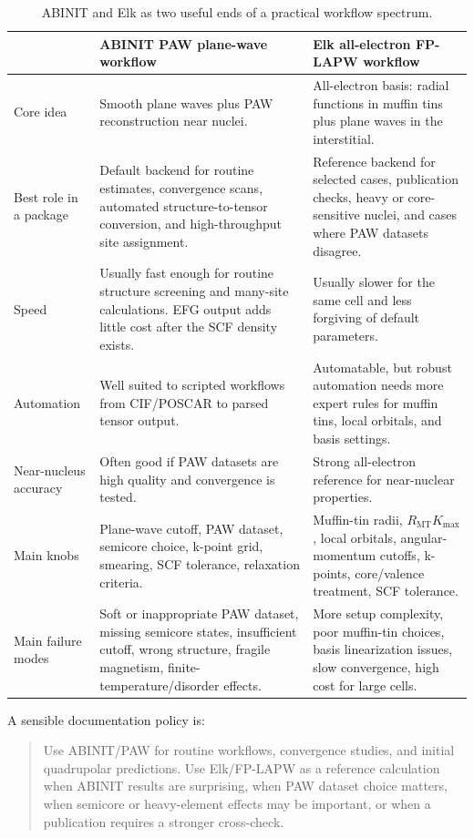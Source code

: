 \documentclass[11pt]{article}
\newcommand{\RMT}{R_{\mathrm{MT}}}
\begin{document}
\begin{table}[H]
\centering
\small
\begin{tabularx}{\textwidth}{L{0.18\textwidth}Y Y}
\toprule
 & \textbf{ABINIT PAW plane-wave workflow} & \textbf{Elk all-electron FP-LAPW workflow} \\
\midrule
Core idea & Smooth plane waves plus PAW reconstruction near nuclei. & All-electron basis: radial functions in muffin tins plus plane waves in the interstitial. \\
Best role in a package & Default backend for routine estimates, convergence scans, automated structure-to-tensor conversion, and high-throughput site assignment. & Reference backend for selected cases, publication checks, heavy or core-sensitive nuclei, and cases where PAW datasets disagree. \\
Speed & Usually fast enough for routine structure screening and many-site calculations.  EFG output adds little cost after the SCF density exists. & Usually slower for the same cell and less forgiving of default parameters. \\
Automation & Well suited to scripted workflows from CIF/POSCAR to parsed tensor output. & Automatable, but robust automation needs more expert rules for muffin tins, local orbitals, and basis settings. \\
Near-nucleus accuracy & Often good if PAW datasets are high quality and convergence is tested. & Strong all-electron reference for near-nuclear properties. \\
Main knobs & Plane-wave cutoff, PAW dataset, semicore choice, k-point grid, smearing, SCF tolerance, relaxation criteria. & Muffin-tin radii, $\RMT K_{\max}$, local orbitals, angular-momentum cutoffs, k-points, core/valence treatment, SCF tolerance. \\
Main failure modes & Soft or inappropriate PAW dataset, missing semicore states, insufficient cutoff, wrong structure, fragile magnetism, finite-temperature/disorder effects. & More setup complexity, poor muffin-tin choices, basis linearization issues, slow convergence, high cost for large cells. \\
\bottomrule
\end{tabularx}
\caption{ABINIT and Elk as two useful ends of a practical workflow spectrum.}
\label{tab:abinit-elk}
\end{table}

A sensible documentation policy is:
\begin{quote}
Use ABINIT/PAW for routine workflows, convergence studies, and initial quadrupolar predictions.  Use Elk/FP-LAPW as a reference calculation when ABINIT results are surprising, when PAW dataset choice matters, when semicore or heavy-element effects may be important, or when a publication requires a stronger cross-check.
\end{quote}
\end{document}

